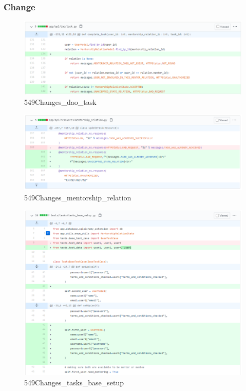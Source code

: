 \documentclass{article}
\begin{document}
\subsubsection{Change}
\begin{figure}[tph!]
\centerline{\includegraphics[totalheight=8cm, width=18cm]{549Changes_dao_task.png}}
    \caption{549Changes\_dao\_task}
    \label{fig:verticalcell}
\end{figure}
\begin{figure}[tph!]
\centerline{\includegraphics[totalheight=8cm, width=18cm]{549Changes_mentorship_relation.png}}
    \caption{549Changes\_mentorship\_relation}
    \label{fig:verticalcell}
\end{figure}
\begin{figure}[tph!]
\centerline{\includegraphics[totalheight=15cm, width=16cm]{549Changes_tasks_base_setup.png}}
    \caption{549Changes\_tasks\_base\_setup}
    \label{fig:verticalcell}
\end{figure}
\end{document}
